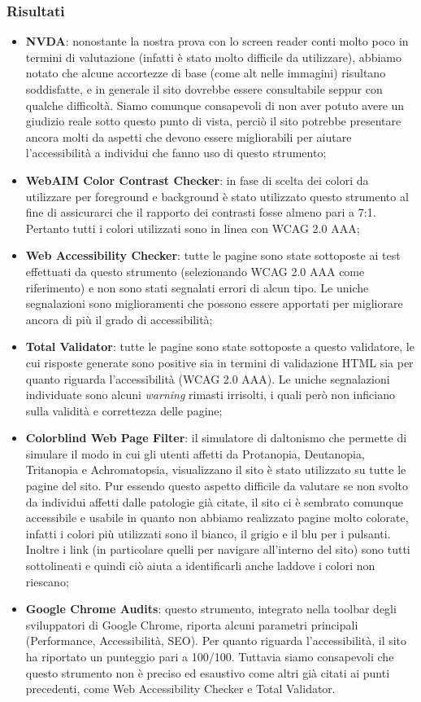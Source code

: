 \documentclass[12pt]{article}
\begin{document}
	\subsubsection{Risultati}
		\begin{itemize}
			\item \textbf{NVDA}: nonostante la nostra prova con lo screen reader conti molto poco in termini di valutazione (infatti è stato molto difficile da utilizzare), abbiamo notato che alcune accortezze di base (come alt nelle immagini) risultano soddisfatte, e in generale il sito dovrebbe essere consultabile seppur con qualche difficoltà. Siamo comunque consapevoli di non aver potuto avere un giudizio reale sotto questo punto di vista, perciò il sito potrebbe presentare ancora molti da aspetti che devono essere migliorabili per aiutare l'accessibilità a individui che fanno uso di questo strumento;
			\item \textbf{WebAIM Color Contrast Checker}: in fase di scelta dei colori da utilizzare per foreground e background è stato utilizzato questo strumento al fine di assicurarci che il rapporto dei contrasti fosse almeno pari a 7:1. Pertanto tutti i colori utilizzati sono in linea con WCAG 2.0 AAA;
			\item \textbf{Web Accessibility Checker}: tutte le pagine sono state sottoposte ai test effettuati da questo strumento (selezionando WCAG 2.0 AAA come riferimento) e non sono stati segnalati errori di alcun tipo. Le uniche segnalazioni sono miglioramenti che possono essere apportati per migliorare ancora di più il grado di accessibilità;
			\item \textbf{Total Validator}: tutte le pagine sono state sottoposte a questo validatore, le cui risposte generate sono positive sia in termini di validazione HTML sia per quanto riguarda l'accessibilità (WCAG 2.0 AAA). Le uniche segnalazioni individuate sono alcuni \emph{warning} rimasti irrisolti, i quali però non inficiano sulla validità e correttezza delle pagine;
			\item \textbf{Colorblind Web Page Filter}: il simulatore di daltonismo che permette di simulare il modo in cui gli utenti affetti da Protanopia, Deutanopia, Tritanopia e Achromatopsia, visualizzano il sito è stato utilizzato su tutte le pagine del sito. Pur essendo questo aspetto difficile da valutare se non svolto da individui affetti dalle patologie già citate, il sito ci è sembrato comunque accessibile e usabile in quanto non abbiamo realizzato pagine molto colorate, infatti i colori più utilizzati sono il bianco, il grigio e il blu per i pulsanti. Inoltre i link (in particolare quelli per navigare all'interno del sito) sono tutti sottolineati e quindi ciò aiuta a identificarli anche laddove i colori non riescano;
			\item \textbf{Google Chrome Audits}: questo strumento, integrato nella toolbar degli sviluppatori di Google Chrome, riporta alcuni parametri principali (Performance, Accessibilità, SEO). Per quanto riguarda l'accessibilità, il sito ha riportato un punteggio pari a 100/100. Tuttavia siamo consapevoli che questo strumento non è preciso ed esaustivo come altri già citati ai punti precedenti, come Web Accessibility Checker e Total Validator.
		\end{itemize}
	
\end{document}
